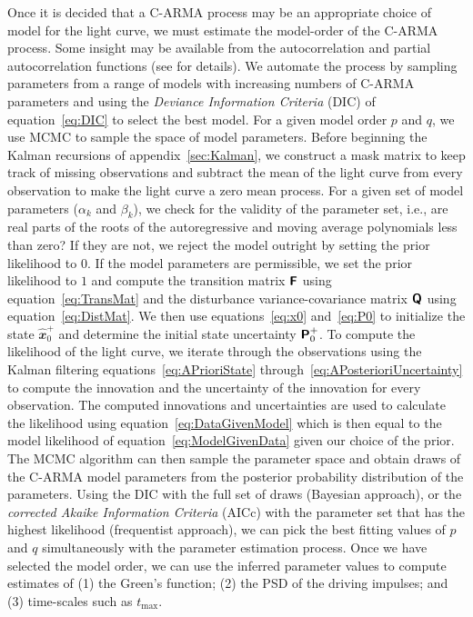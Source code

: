 \documentclass[a4paper,fleqn,usenatbib]{mnras}
\begin{document}
Once it is decided that a C-ARMA process may be an appropriate choice of model for the light curve, we must estimate the model-order of the C-ARMA process. Some insight may be available from the autocorrelation and partial autocorrelation functions (see \citealp{BrockwellDavisITSF} for details). We automate the process by sampling parameters from a range of models with increasing numbers of C-ARMA parameters and using the \textit{Deviance Information Criteria} (DIC) of equation~\eqref{eq:DIC} to select the best model. For a given model order $p$ and $q$, we use MCMC to sample the space of model parameters. Before beginning the Kalman recursions of appendix~\ref{sec:Kalman}, we construct a mask matrix to keep track of missing observations and subtract the mean of the light curve from every observation to make the light curve a zero mean process. For a given set of model parameters ($\alpha_{k}$ and $\beta_{k}$), we check for the validity of the parameter set, i.e., are real parts of the roots of the autoregressive and moving average polynomials less than zero? If they are not, we reject the model outright by setting the prior likelihood to $0$. If the model parameters are permissible, we set the prior likelihood to $1$ and compute the transition matrix $\textbf{\textsf{F}}$ using equation~\eqref{eq:TransMat} and the disturbance variance-covariance matrix $\textbf{\textsf{Q}}$ using equation~\eqref{eq:DistMat}. We then use equations~\eqref{eq:x0} and~\eqref{eq:P0} to initialize the state $\widehat{\mathbfit{x}}^{+}_{0}$ and determine the initial state uncertainty $\textbf{\textsf{P}}^{+}_{0}$. To compute the likelihood of the light curve, we iterate through the observations using the Kalman filtering equations~\eqref{eq:APrioriState} through~\eqref{eq:APosterioriUncertainty} to compute the innovation and the uncertainty of the innovation for every observation. The computed innovations and uncertainties are used to calculate the likelihood using equation~\eqref{eq:DataGivenModel} which is then equal to the model likelihood of equation~\eqref{eq:ModelGivenData} given our choice of the prior. The MCMC algorithm can then sample the parameter space and obtain draws of the C-ARMA model parameters from the posterior probability distribution of the parameters. Using the DIC with the full set of draws (Bayesian approach), or the \textit{corrected Akaike Information Criteria} (AICc) with the parameter set that has the highest likelihood (frequentist approach), we can pick the best fitting values of $p$ and $q$ simultaneously with the parameter estimation process. Once we have selected the model order, we can use the inferred parameter values to compute estimates of (1) the Green's function; (2) the PSD of the driving impulses; and (3) time-scales such as $t_\mathrm{max}$.
\end{document}
